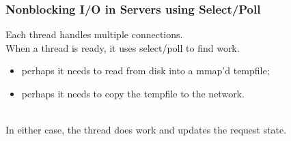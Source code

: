 \begin{frame}
  \frametitle{Nonblocking I/O in Servers using Select/Poll}

  
    Each thread handles multiple connections.\\[1em]

    When a thread is ready, it uses select/poll to find work.\\

    \begin{itemize}
      \item perhaps it needs to read from disk into a mmap'd tempfile;
      \item perhaps it needs to copy the tempfile to the network.
    \end{itemize}~\\
    In either case, the thread does work and updates the request state.
  
\end{frame}




